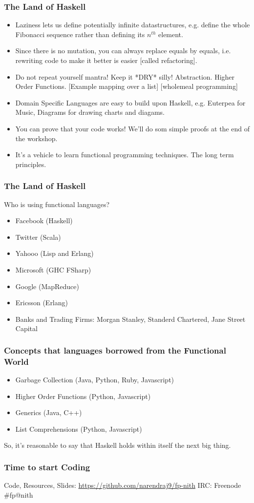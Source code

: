 \documentclass{beamer}
\begin{document}
\begin{frame}
  \frametitle{The Land of Haskell}

  \begin{itemize}
  \item Laziness lets us define potentially infinite datastructures, e.g. define the whole
    Fibonacci sequence rather than defining its $n^{th}$ element.
  \item Since there is no mutation, you can always replace equals by equals, i.e. rewriting code
    to make it better is easier [called refactoring].
  \item Do not repeat yourself mantra! Keep it *DRY* silly! Abstraction. Higher Order Functions.
    [Example mapping over a list] [wholemeal programming]
  \item Domain Specific Languages are easy to build upon Haskell, e.g. Euterpea for Music,
    Diagrams for drawing charts and diagams.
  \item You can prove that your code works! We'll do som simple proofs at the end of the workshop.
  \item It's a vehicle to learn functional programming techniques. The long term principles.
  \end{itemize}

\end{frame}

\begin{frame}[t]
  \frametitle{The Land of Haskell}

  Who is using functional languages?

  \begin{itemize}
  \item Facebook (Haskell)
  \item Twitter (Scala)
  \item Yahooo (Lisp and Erlang)
  \item Microsoft (GHC FSharp)
  \item Google (MapReduce)
  \item Ericsson (Erlang)
  \item Banks and Trading Firms: Morgan Stanley, Standerd Chartered, Jane Street Capital
  \end{itemize}

\end{frame}


\begin{frame}[t]
  \frametitle{Concepts that languages borrowed from the Functional World}

  \begin{itemize}
  \item Garbage Collection (Java, Python, Ruby, Javascript)
  \item Higher Order Functions (Python, Javascript)
  \item Generics (Java, C++)
  \item List Comprehensions (Python, Javascript)
  \end{itemize}

  So, it's reasonable to say that Haskell holds within itself the next big thing.
\end{frame}

\begin{frame}
  \frametitle{Time to start Coding}
  Code, Resources, Slides: \url{https://github.com/narendraj9/fp-nith}
  IRC: Freenode \#fp@nith


\end{frame}
\end{document}
